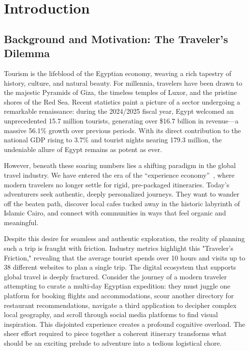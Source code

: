 \chapter{Introduction}

\section{Background and Motivation: The Traveler's Dilemma}
Tourism is the lifeblood of the Egyptian economy, weaving a rich tapestry of history, culture, and natural beauty. For millennia, travelers have been drawn to the majestic Pyramids of Giza, the timeless temples of Luxor, and the pristine shores of the Red Sea. Recent statistics paint a picture of a sector undergoing a remarkable renaissance: during the 2024/2025 fiscal year, Egypt welcomed an unprecedented 15.7 million tourists, generating over \$16.7 billion in revenue---a massive 56.1\% growth over previous periods. With its direct contribution to the national GDP rising to 3.7\% and tourist nights nearing 179.3 million, the undeniable allure of Egypt remains as potent as ever. 

However, beneath these soaring numbers lies a shifting paradigm in the global travel industry. We have entered the era of the ``experience economy''~\cite{pine1998welcome}, where modern travelers no longer settle for rigid, pre-packaged itineraries. Today's adventurers seek authentic, deeply personalized journeys. They want to wander off the beaten path, discover local cafes tucked away in the historic labyrinth of Islamic Cairo, and connect with communities in ways that feel organic and meaningful. 

Despite this desire for seamless and authentic exploration, the reality of planning such a trip is fraught with friction. Industry metrics highlight this "Traveler's Friction," revealing that the average tourist spends over 10 hours and visits up to 38 different websites to plan a single trip. The digital ecosystem that supports global travel is deeply fractured. Consider the journey of a modern traveler attempting to curate a multi-day Egyptian expedition: they must juggle one platform for booking flights and accommodations, scour another directory for restaurant recommendations, navigate a third application to decipher complex local geography, and scroll through social media platforms to find visual inspiration. This disjointed experience creates a profound cognitive overload. The sheer effort required to piece together a coherent itinerary transforms what should be an exciting prelude to adventure into a tedious logistical chore. 

